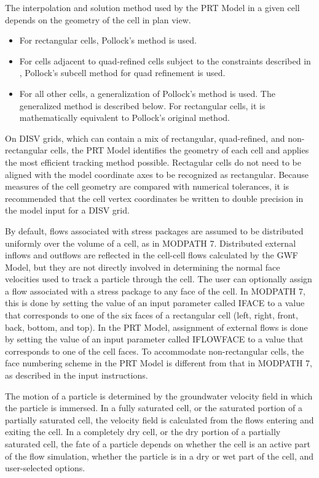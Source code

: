 The interpolation and solution method used by the PRT Model in a given cell depends on the geometry of the cell in plan view.

\begin{itemize}
\item For rectangular cells, Pollock's method \citep{pollock2016modpath7} is used.
\item For cells adjacent to quad-refined cells subject to the constraints described in \citep{pollock2016modpath7}, Pollock's subcell method for quad refinement \citep{pollock2015} is used.
\item For all other \mf cells, a generalization of Pollock's method is used. The generalized method is described below. For rectangular cells, it is mathematically equivalent to Pollock's original method.
\end{itemize}

\noindent On DISV grids, which can contain a mix of rectangular, quad-refined, and non-rectangular cells, the PRT Model identifies the geometry of each cell and applies the most efficient tracking method possible. Rectagular cells do not need to be aligned with the model coordinate axes to be recognized as rectangular. Because measures of the cell geometry are compared with numerical tolerances, it is recommended that the cell vertex coordinates be written to double precision in the model input for a DISV grid.

By default, flows associated with stress packages are assumed to be distributed uniformly over the volume of a cell, as in MODPATH 7. Distributed external inflows and outflows are reflected in the cell-cell flows calculated by the GWF Model, but they are not directly involved in determining the normal face velocities used to track a particle through the cell. The user can optionally assign a flow associated with a stress package to any face of the cell. In MODPATH 7, this is done by setting the value of an input parameter called IFACE to a value that corresponds to one of the six faces of a rectangular cell (left, right, front, back, bottom, and top). In the PRT Model, assignment of external flows is done by setting the value of an input parameter called IFLOWFACE to a value that corresponds to one of the cell faces. To accommodate non-rectangular cells, the face numbering scheme in the PRT Model is different from that in MODPATH 7, as described in the \mf input instructions.

The motion of a particle is determined by the groundwater velocity field in which the particle is immersed. In a fully saturated cell, or the saturated portion of a partially saturated cell, the velocity field is calculated from the flows entering and exiting the cell. In a completely dry cell, or the dry portion of a partially saturated cell, the fate of a particle depends on whether the cell is an active part of the flow simulation, whether the particle is in a dry or wet part of the cell, and user-selected options.

